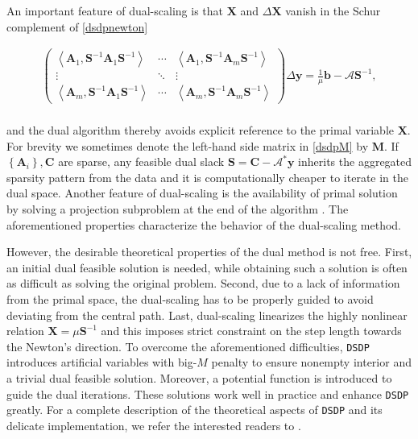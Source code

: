 An important feature of dual-scaling is that $\mathbf{X}$ and $\Delta \mathbf{X}$
vanish in the Schur complement of \eqref{dsdpnewton}

\begin{eqnarray} \label{dsdpM}
	\left(\begin{array}{ccc}
     \left\langle \mathbf{A}_1, \mathbf{S}^{- 1} \mathbf{A}_1 \mathbf{S}^{- 1} \right\rangle & \cdots &
     \left\langle \mathbf{A}_1, \mathbf{S}^{- 1} \mathbf{A}_m \mathbf{S}^{- 1} \right\rangle\\
     \vdots & \ddots & \vdots\\
     \left\langle \mathbf{A}_m, \mathbf{S}^{- 1} \mathbf{A}_1 \mathbf{S}^{- 1} \right\rangle & \cdots &
     \left\langle \mathbf{A}_m, \mathbf{S}^{- 1} \mathbf{A}_m \mathbf{S}^{- 1} \right\rangle
   \end{array}\right) \Delta \mathbf{y} = \frac{1}{\mu} \mathbf{b} - \mathcal{A} \mathbf{S}^{- 1},
\end{eqnarray}\\
and the dual algorithm thereby avoids explicit reference to the primal
variable $\mathbf{X}$. For brevity we sometimes denote the left-hand side matrix in \eqref{dsdpM} by $\mathbf{M}$.
If $\left\{ \mathbf{A}_i \right\}, \mathbf{C}$ are sparse, any feasible dual slack $\mathbf{S} = \mathbf{C}
-\mathcal{A}^{\ast} \mathbf{y}$ inherits the aggregated sparsity pattern from the data and it is
computationally cheaper to iterate in the dual space.
Another feature of dual-scaling is the availability of primal
solution by solving a projection subproblem at the end of the algorithm \cite{benson2008algorithm}. The
aforementioned properties characterize the behavior of the dual-scaling method.

However, the desirable theoretical properties of the dual method is not free.  First, an initial dual feasible solution is needed, while obtaining such a
solution is often as difficult as solving the original problem. Second, due to
a lack of information from the primal space, the dual-scaling has to be properly guided to avoid deviating from the central path. Last,
dual-scaling linearizes the highly nonlinear relation $\mathbf{X} = \mu \mathbf{S}^{- 1}$ and
this imposes strict constraint on the step length towards the Newton's direction. To overcome the aforementioned difficulties, {{\texttt{DSDP}}}
introduces artificial variables with big-$M$ penalty to ensure nonempty interior and a trivial dual feasible solution. Moreover, a potential function is introduced 
to guide the dual iterations. These solutions work well in practice and enhance {{\texttt{DSDP}}} greatly. For a complete description of the theoretical aspects of {{\texttt{DSDP}}} and
its delicate implementation, we refer the interested readers to
{\cite{benson2000solving, benson2008algorithm}}.

